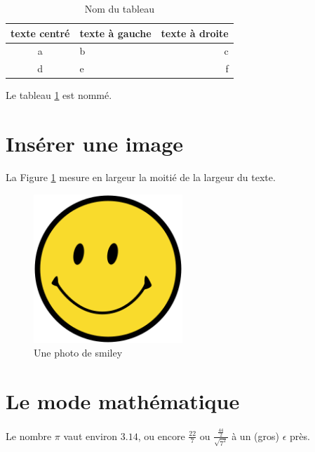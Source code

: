 \documentclass[12pt]{article}
\begin{document}
\begin{table}[ht]
 \begin{center}
	\begin{tabular}{|c|l|r|}
		\hline
		texte centré & texte à gauche & texte à droite  \\\hline
		a & b & c \\\hline
		d & e & f \\\hline
	\end{tabular}
 \end{center}
 \caption{Nom du tableau}
 \label{tab:mon_tableau}
\end{table}

Le tableau \ref{tab:mon_tableau} est nommé.

\section{Insérer une image}

La Figure \ref{fig:mon_image} mesure en largeur la moitié de la largeur du texte.

\begin{figure}[ht]
  \begin{center}
    \includegraphics[width=0.5\textwidth]{./images/smiley.png} 
  \end{center}
  \caption{Une photo de smiley}
  \label{fig:mon_image}
\end{figure}

\section{Le mode mathématique}


Le nombre $\pi$ vaut environ $3.14$, ou encore $\frac{22}{7}$ ou $\frac{\frac{44}{2}}{\sqrt{7^2}}$ à un (gros) $\epsilon$ près.\\
\end{document}
